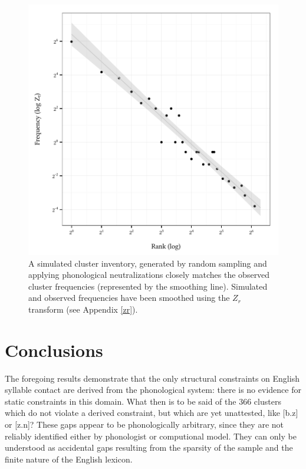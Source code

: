 \begin{figure}
\centering
\includegraphics{sim.pdf}
\caption{A simulated cluster inventory, generated by random sampling and applying phonological neutralizations closely matches the observed cluster frequencies (represented by the smoothing line). Simulated and observed frequencies have been smoothed using the $Z_r$ transform (see Appendix \ref{zr}).}
\label{sim}
\end{figure}

\section{Conclusions}

The foregoing results demonstrate that the only structural constraints on English syllable contact are derived from the phonological system: there is no evidence for static constraints in this domain.
What then is to be said of the 366 clusters which do not violate a derived constraint, but which are yet unattested, like [b.z] or [z.n]? 
These gaps appear to be phonologically arbitrary, since they are not reliably identified either by phonologist or computional model.
They can only be understood as accidental gaps resulting from the sparsity of the sample and the finite nature of the English lexicon.

